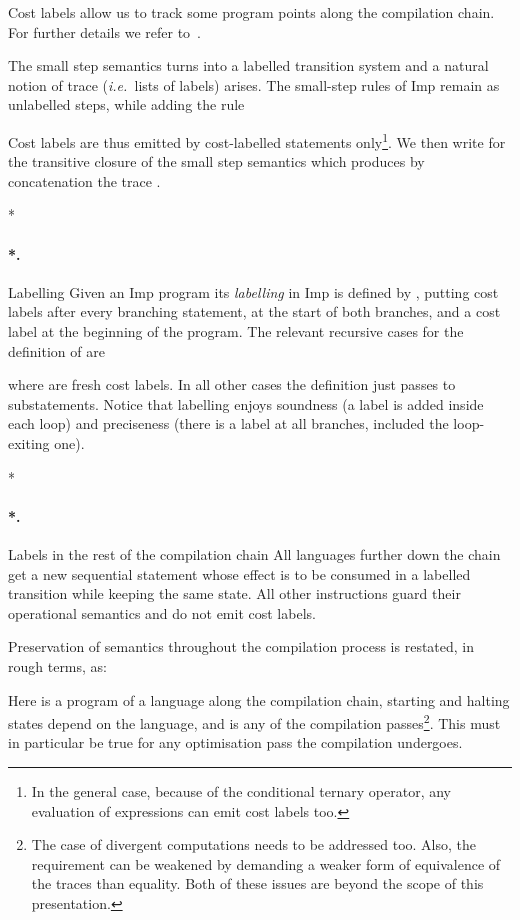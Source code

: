 \documentclass[submission,copyright,creativecommons]{eptcs}
\makeatletter
\theoremstyle{definition}
\newcommand{\imp}{{\sf Imp}}            \newcommand{\vm}{{\sf Vm}}              \newcommand{\mips}{{\sf Mips}}          \newcommand{\Clight}{{\sf Clight}}        \newcommand{\Cminor}{{\sf Cminor}}
\newcommand{\ie}{\emph{i.e.\ }}
\let\oldparagraph\paragraph
\def\paragraph{\@ifnextchar*\new@paragraph@star\new@paragraph}
\def\new@paragraph@star*#1{\oldparagraph*{#1.}}
\def\new@paragraph#1{\oldparagraph{#1.}}
\makeatother
\begin{document}
Cost labels allow us to track some program points along the compilation chain.
For further details we refer to~\cite{labeling}.

The small step semantics turns into a labelled transition system
and a natural notion of trace (\ie lists of labels) arises. The small-step rules
of \imp{} remain as unlabelled steps, while adding the rule

Cost labels are thus emitted by cost-labelled statements only\footnote{In the general case,
because of the conditional ternary operator, any evaluation of expressions can emit cost labels too.}.
We then write  for the transitive closure of the small step semantics which produces by concatenation the trace .

\paragraph*{Labelling}
Given an \imp{} program  its \emph{labelling}
in \imp{} is defined by ,
putting cost labels after every branching statement, at the start of both branches, and a cost label at the beginning of the program.
The relevant recursive cases for the definition of  are

where  are fresh cost labels.
In all other cases the definition just passes to substatements. Notice that
labelling enjoys soundness (a label is added inside each loop) and preciseness
(there is a label at all branches, included the loop-exiting one).

\paragraph*{Labels in the rest of the compilation chain}
All languages further down the chain get a new sequential statement  whose effect is to be consumed in a labelled transition while keeping the same state.
All other instructions guard their operational semantics and do not emit cost labels.

Preservation of semantics throughout the compilation process is restated, in rough terms, as:

Here  is a program of a language along the compilation chain, starting and halting states depend on the language, and  is any of the compilation passes\footnote{The case of divergent computations needs to be addressed too.
Also, the requirement can be weakened by demanding a weaker form of equivalence of the traces than equality.
Both of these issues are beyond the scope of this presentation.}. This must in
particular be true for any optimisation pass the compilation undergoes.
\end{document}
